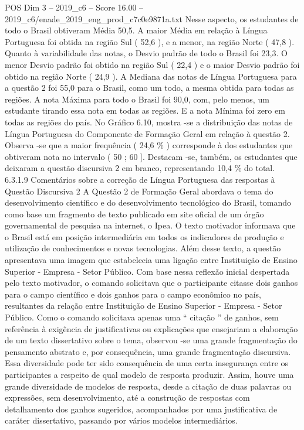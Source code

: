 \begin{textsample}{POS Dim 3 – 2019\_c6 – Score 16.00 – 2019\_c6/enade\_2019\_eng\_prod\_c7c0e9871a.txt}
Nesse aspecto, os estudantes de todo o Brasil obtiveram Média 50,5.
A maior Média em relação à Língua Portuguesa foi obtida na região Sul ( 52,6 ), e a menor, na região Norte ( 47,8 ).
Quanto à variabilidade das notas, o Desvio padrão de todo o Brasil foi 23,3.
O menor Desvio padrão foi obtido na região Sul ( 22,4 ) e o maior Desvio padrão foi obtido na região Norte ( 24,9 ).
A Mediana das notas de Língua Portuguesa para a questão 2 foi 55,0 para o Brasil, como um todo, a mesma obtida para todas as regiões.
A nota Máxima para todo o Brasil foi 90,0, com, pelo menos, um estudante tirando essa nota em todas as regiões.
E a nota Mínima foi zero em todas as regiões do país.
No Gráfico 6.10, mostra -se a distribuição das notas de Língua Portuguesa do Componente de Formação Geral em relação à questão 2.
Observa -se que a maior frequência ( 24,6 \% ) corresponde à dos estudantes que obtiveram nota no intervalo ( 50 ; 60 ].
Destacam -se, também, os estudantes que deixaram a questão discursiva 2 em branco, representando 10,4 \% do total. 6.3.1.9 Comentários sobre a correção de Língua Portuguesa das respostas à Questão Discursiva 2 A Questão 2 de Formação Geral abordava o tema do desenvolvimento científico e do desenvolvimento tecnológico do Brasil, tomando como base um fragmento de texto publicado em site oficial de um órgão governamental de pesquisa na internet, o Ipea.
O texto motivador informava que o Brasil está em posição intermediária em todos os indicadores de produção e utilização de conhecimentos e novas tecnologias.
Além desse texto, a questão apresentava uma imagem que estabelecia uma ligação entre Instituição de Ensino Superior - Empresa - Setor Público.
Com base nessa reflexão inicial despertada pelo texto motivador, o comando solicitava que o participante citasse dois ganhos para o campo científico e dois ganhos para o campo econômico no país, resultantes da relação entre Instituição de Ensino Superior - Empresa - Setor Público.
Como o comando solicitava apenas uma “ citação ” de ganhos, sem referência à exigência de justificativas ou explicações que ensejariam a elaboração de um texto dissertativo sobre o tema, observou -se uma grande fragmentação do pensamento abstrato e, por consequência, uma grande fragmentação discursiva.
Essa diversidade pode ter sido consequência de uma certa insegurança entre os participantes a respeito de qual modelo de resposta produzir.
Assim, houve uma grande diversidade de modelos de resposta, desde a citação de duas palavras ou expressões, sem desenvolvimento, até a construção de respostas com detalhamento dos ganhos sugeridos, acompanhados por uma justificativa de caráter dissertativo, passando por vários modelos intermediários.

\end{textsample}
